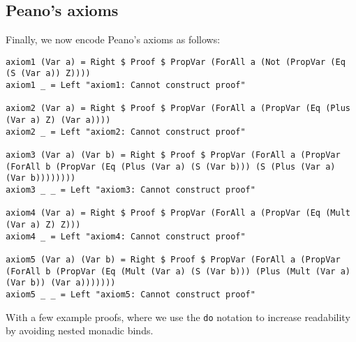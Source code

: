 \documentclass{article}
\begin{document}
\subsection{Peano's axioms}

Finally, we now encode Peano's axioms as follows:

\begin{lstlisting}
axiom1 (Var a) = Right $ Proof $ PropVar (ForAll a (Not (PropVar (Eq (S (Var a)) Z))))
axiom1 _ = Left "axiom1: Cannot construct proof"

axiom2 (Var a) = Right $ Proof $ PropVar (ForAll a (PropVar (Eq (Plus (Var a) Z) (Var a))))
axiom2 _ = Left "axiom2: Cannot construct proof"

axiom3 (Var a) (Var b) = Right $ Proof $ PropVar (ForAll a (PropVar (ForAll b (PropVar (Eq (Plus (Var a) (S (Var b))) (S (Plus (Var a) (Var b))))))))
axiom3 _ _ = Left "axiom3: Cannot construct proof"

axiom4 (Var a) = Right $ Proof $ PropVar (ForAll a (PropVar (Eq (Mult (Var a) Z) Z)))
axiom4 _ = Left "axiom4: Cannot construct proof"

axiom5 (Var a) (Var b) = Right $ Proof $ PropVar (ForAll a (PropVar (ForAll b (PropVar (Eq (Mult (Var a) (S (Var b))) (Plus (Mult (Var a) (Var b)) (Var a)))))))
axiom5 _ _ = Left "axiom5: Cannot construct proof"
\end{lstlisting}

With a few example proofs, where we use the \texttt{do} notation to increase readability by avoiding nested monadic binds.
\end{document}
